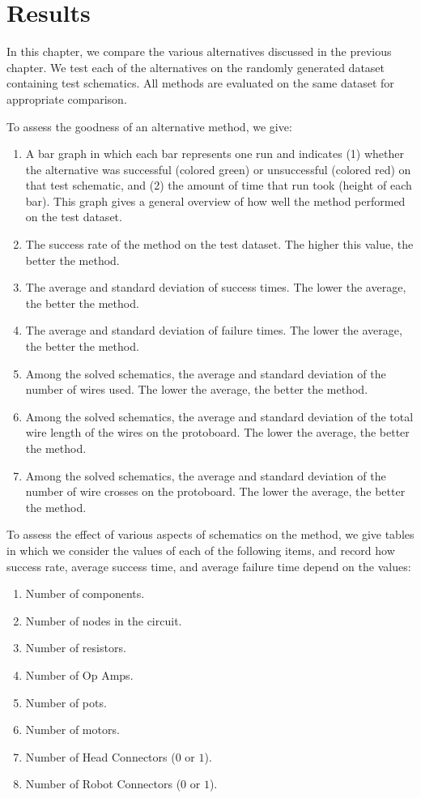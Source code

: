 
\chapter{Results}
\label{ch:results}

In this chapter, we compare the various alternatives discussed in the previous
chapter. We test each of the alternatives on the randomly generated dataset
containing \q test schematics. All methods are evaluated on the same dataset for
appropriate comparison.

To assess the goodness of an alternative method, we give:
\begin{enumerate}
\item A bar graph in which each bar represents one run and indicates (1) whether
the alternative was successful (colored green) or unsuccessful (colored red)  on
that test schematic, and (2) the amount of time that run took (height of each
bar). This graph gives a general overview of how well the method performed on
the test dataset.
\item The success rate of the method on the test dataset. The higher this value,
the better the method.
\item The average and standard deviation of success times. The lower the average,
the better the method.
\item The average and standard deviation of failure times. The lower the average,
the better the method.
\item Among the solved schematics, the average and standard deviation of the
number of wires used. The lower the average, the better the method.
\item Among the solved schematics, the average and standard deviation of the
total wire length of the wires on the protoboard. The lower the average, the
better the method.
\item Among the solved schematics, the average and standard deviation of the
number of wire crosses on the protoboard. The lower the average, the better the
method.
\end{enumerate}

To assess the effect of various aspects of schematics on the method, we give
tables in which we consider the values of each of the following items, and
record how success rate, average success time, and average failure time depend on the values:
\begin{enumerate}
\item Number of components.
\item Number of nodes in the circuit.
\item Number of resistors.
\item Number of Op Amps.
\item Number of pots.
\item Number of motors.
\item Number of Head Connectors ($0$ or $1$).
\item Number of Robot Connectors ($0$ or $1$).
\end{enumerate}

